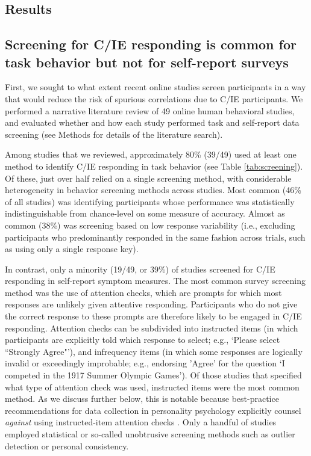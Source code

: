 \documentclass[a4paper,notitlepage,12pt]{article}
\begin{document}
\begin{refsection}[main]
\section{Results}

\subsection{Screening for C/IE responding is common for task behavior but not for self-report surveys}

First, we sought to what extent recent online studies screen participants in a way that would reduce the risk of spurious correlations due to C/IE participants. We performed a narrative literature review of 49 online human behavioral studies, and evaluated whether and how each study performed task and self-report data screening (see Methods for details of the literature search).

Among studies that we reviewed, approximately 80\% (39/49) used at least one method to identify C/IE responding in task behavior (see Table \ref{tab:screening}). Of these, just over half relied on a single screening method, with considerable heterogeneity in behavior screening methods across studies. Most common (46\% of all studies) was identifying participants whose performance was statistically indistinguishable from chance-level on some measure of accuracy. Almost as common (38\%) was screening based on low response variability (i.e., excluding participants who predominantly responded in the same fashion across trials, such as using only a single response key).

In contrast, only a minority (19/49, or 39\%) of studies screened for C/IE responding in self-report symptom measures. The most common survey screening method was the use of attention checks, which are prompts for which most responses are unlikely given attentive responding. Participants who do not give the correct response to these prompts are therefore likely to be engaged in C/IE responding. Attention checks can be subdivided into instructed items (in which participants are explicitly told which response to select; e.g., `Please select ``Strongly Agree"'), and infrequency items (in which some responses are logically invalid or exceedingly improbable; e.g., endorsing 'Agree' for the question `I competed in the 1917 Summer Olympic Games'). Of those studies that specified what type of attention check was used, instructed items were the most common method. As we discuss further below, this is notable because best-practice recommendations for data collection in personality psychology explicitly counsel \emph{against} using instructed-item attention checks \cite{barends2019noncompliant, thomas2017validity, hauser2016attentive}. Only a handful of studies employed statistical or so-called unobtrusive screening methods such as outlier detection or personal consistency. 


\end{refsection}
\end{document}
